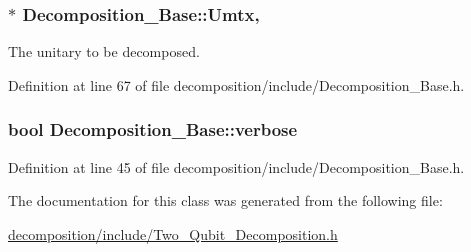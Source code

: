 \subsubsection[{\texorpdfstring{Umtx}{Umtx}}]{ $\ast$ Decomposition\+\_\+\+Base\+::\+Umtx\hspace{0.3cm}{\ttfamily [protected]}, {\ttfamily [inherited]}}\hypertarget{class_decomposition___base_a61a784aaba39276260b3f73709b51ccc}{}\label{class_decomposition___base_a61a784aaba39276260b3f73709b51ccc}


The unitary to be decomposed. 



Definition at line 67 of file decomposition/include/\+Decomposition\+\_\+\+Base.\+h.

\subsubsection[{\texorpdfstring{verbose}{verbose}}]{\setlength{\rightskip}{0pt plus 5cm}bool Decomposition\+\_\+\+Base\+::verbose\hspace{0.3cm}{\ttfamily [inherited]}}\hypertarget{class_decomposition___base_a0636a9e49a19f7167b7abdf309882042}{}\label{class_decomposition___base_a0636a9e49a19f7167b7abdf309882042}


Definition at line 45 of file decomposition/include/\+Decomposition\+\_\+\+Base.\+h.



The documentation for this class was generated from the following file\+:\begin{DoxyCompactItemize}
\item 
\hyperlink{decomposition_2include_2_two___qubit___decomposition_8h}{decomposition/include/\+Two\+\_\+\+Qubit\+\_\+\+Decomposition.\+h}\end{DoxyCompactItemize}
